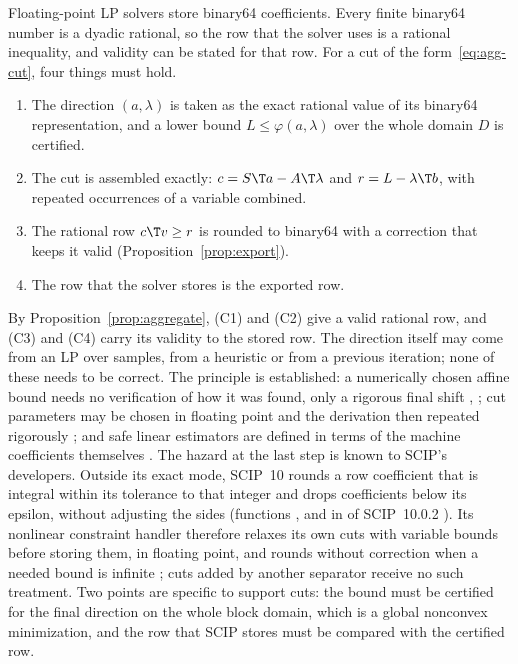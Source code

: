 Floating-point LP solvers store binary64 coefficients. Every finite binary64
number is a dyadic rational, so the row that the solver uses is a rational
inequality, and validity can be stated for that row. For a cut of the
form~\eqref{eq:agg-cut}, four things must hold.
\begin{enumerate}[label=(C\arabic*)]
\item The direction $(a,\lambda)$ is taken as the exact rational value of its
binary64 representation, and a lower bound $L\le\varphi(a,\lambda)$ over the
whole domain $D$ is certified.
\item The cut is assembled exactly: $c=S\T a-A\T\lambda$ and $r=L-\lambda\T b$,
with repeated occurrences of a variable combined.
\item The rational row $c\T v\ge r$ is rounded to binary64 with a correction
that keeps it valid (Proposition~\ref{prop:export}).
\item The row that the solver stores is the exported row.
\end{enumerate}
By Proposition~\ref{prop:aggregate}, (C1) and (C2) give a valid rational row,
and (C3) and (C4) carry its validity to the stored row. The direction itself
may come from an LP over samples, from a heuristic or from a previous
iteration; none of these needs to be correct. The principle is established:
a numerically chosen affine bound needs no verification of how it was found,
only a rigorous final shift \citep[Section~5]{GarloffJanssonSmith2003JCAM},
\citep{GarloffSmith2008}; cut parameters may be chosen in floating point and
the derivation then repeated rigorously
\citep[p.~294]{NeumaierShcherbina2004}; and safe linear estimators are
defined in terms of the machine coefficients themselves
\citep{BorradaileVanHentenryck2005}. The hazard at the last step is known to
SCIP's developers. Outside its exact mode, SCIP~10 rounds a row coefficient
that is integral within its tolerance to that integer and drops coefficients
below its epsilon, without adjusting the sides (functions ,
 and  in  of SCIP~10.0.2
\citep{SCIPsource10}). Its nonlinear constraint handler therefore relaxes its
own cuts with variable bounds before storing them, in floating point, and
rounds without correction when a needed bound is infinite
\citep[Section~4.2.10]{SCIP8report}; cuts added by another separator receive
no such treatment. Two points are specific to support cuts: the bound must be
certified for the final direction on the whole block domain, which is a
global nonconvex minimization, and the row that SCIP stores must be compared
with the certified row.

